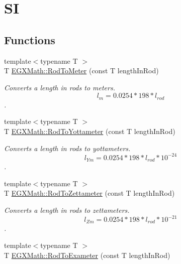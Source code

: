\hypertarget{group___e_g_x_math-_conversions-_length_conversions-_surveyors-_rod-_s_i}{}\section{SI}
\label{group___e_g_x_math-_conversions-_length_conversions-_surveyors-_rod-_s_i}
\subsection*{Functions}
\begin{DoxyCompactItemize}
\item 
{\footnotesize template$<$typename T $>$ }\\T \mbox{\hyperlink{group___e_g_x_math-_conversions-_length_conversions-_surveyors-_rod-_s_i_gabe33821aac19a508109735df98a1e74c}{E\+G\+X\+Math\+::\+Rod\+To\+Meter}} (const T length\+In\+Rod)
\begin{DoxyCompactList}\small\item\em Converts a length in rods to meters. \[ l_{m}=0.0254 * 198 * l_{rod} \]. \end{DoxyCompactList}\item 
{\footnotesize template$<$typename T $>$ }\\T \mbox{\hyperlink{group___e_g_x_math-_conversions-_length_conversions-_surveyors-_rod-_s_i_ga0e3f1a816c8a67c7825b3b82ecf54b26}{E\+G\+X\+Math\+::\+Rod\+To\+Yottameter}} (const T length\+In\+Rod)
\begin{DoxyCompactList}\small\item\em Converts a length in rods to yottameters. \[ l_{Ym}=0.0254 * 198 * l_{rod} * 10^{-24} \]. \end{DoxyCompactList}\item 
{\footnotesize template$<$typename T $>$ }\\T \mbox{\hyperlink{group___e_g_x_math-_conversions-_length_conversions-_surveyors-_rod-_s_i_gaccf39081a4e69ba4b9384ef6f9c354d7}{E\+G\+X\+Math\+::\+Rod\+To\+Zettameter}} (const T length\+In\+Rod)
\begin{DoxyCompactList}\small\item\em Converts a length in rods to zettameters. \[ l_{Zm}=0.0254 * 198 * l_{rod} * 10^{-21} \]. \end{DoxyCompactList}\item 
{\footnotesize template$<$typename T $>$ }\\T \mbox{\hyperlink{group___e_g_x_math-_conversions-_length_conversions-_surveyors-_rod-_s_i_ga2e5ab24819c55373287494675f74f3a9}{E\+G\+X\+Math\+::\+Rod\+To\+Exameter}} (const T length\+In\+Rod)

\end{DoxyCompactItemize}
